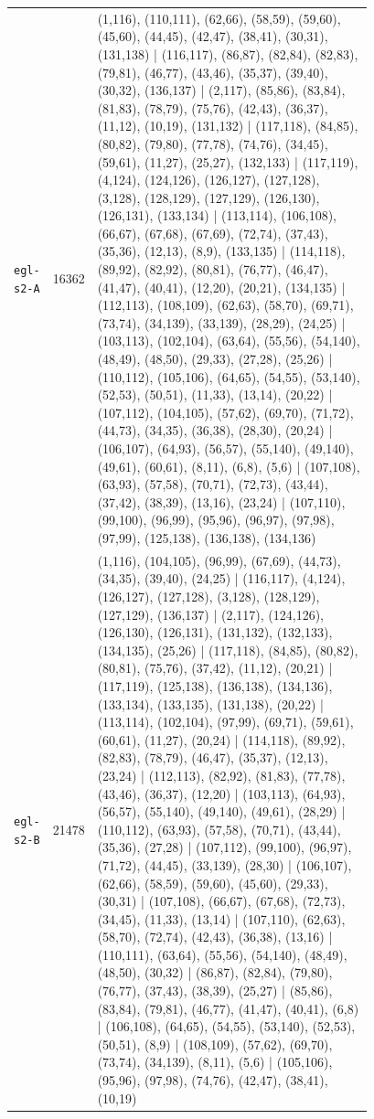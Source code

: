 \begin{landscape}
\begin{longtable}{lr>{\tiny\raggedright\arraybackslash}p{0.78\linewidth}}
\texttt{egl-s2-A} & 16362 & (1,116), (110,111), (62,66), (58,59), (59,60), (45,60), (44,45), (42,47), (38,41), (30,31), (131,138) | (116,117), (86,87), (82,84), (82,83), (79,81), (46,77), (43,46), (35,37), (39,40), (30,32), (136,137) | (2,117), (85,86), (83,84), (81,83), (78,79), (75,76), (42,43), (36,37), (11,12), (10,19), (131,132) | (117,118), (84,85), (80,82), (79,80), (77,78), (74,76), (34,45), (59,61), (11,27), (25,27), (132,133) | (117,119), (4,124), (124,126), (126,127), (127,128), (3,128), (128,129), (127,129), (126,130), (126,131), (133,134) | (113,114), (106,108), (66,67), (67,68), (67,69), (72,74), (37,43), (35,36), (12,13), (8,9), (133,135) | (114,118), (89,92), (82,92), (80,81), (76,77), (46,47), (41,47), (40,41), (12,20), (20,21), (134,135) | (112,113), (108,109), (62,63), (58,70), (69,71), (73,74), (34,139), (33,139), (28,29), (24,25) | (103,113), (102,104), (63,64), (55,56), (54,140), (48,49), (48,50), (29,33), (27,28), (25,26) | (110,112), (105,106), (64,65), (54,55), (53,140), (52,53), (50,51), (11,33), (13,14), (20,22) | (107,112), (104,105), (57,62), (69,70), (71,72), (44,73), (34,35), (36,38), (28,30), (20,24) | (106,107), (64,93), (56,57), (55,140), (49,140), (49,61), (60,61), (8,11), (6,8), (5,6) | (107,108), (63,93), (57,58), (70,71), (72,73), (43,44), (37,42), (38,39), (13,16), (23,24) | (107,110), (99,100), (96,99), (95,96), (96,97), (97,98), (97,99), (125,138), (136,138), (134,136) \\[2pt]
\texttt{egl-s2-B} & 21478 & (1,116), (104,105), (96,99), (67,69), (44,73), (34,35), (39,40), (24,25) | (116,117), (4,124), (126,127), (127,128), (3,128), (128,129), (127,129), (136,137) | (2,117), (124,126), (126,130), (126,131), (131,132), (132,133), (134,135), (25,26) | (117,118), (84,85), (80,82), (80,81), (75,76), (37,42), (11,12), (20,21) | (117,119), (125,138), (136,138), (134,136), (133,134), (133,135), (131,138), (20,22) | (113,114), (102,104), (97,99), (69,71), (59,61), (60,61), (11,27), (20,24) | (114,118), (89,92), (82,83), (78,79), (46,47), (35,37), (12,13), (23,24) | (112,113), (82,92), (81,83), (77,78), (43,46), (36,37), (12,20) | (103,113), (64,93), (56,57), (55,140), (49,140), (49,61), (28,29) | (110,112), (63,93), (57,58), (70,71), (43,44), (35,36), (27,28) | (107,112), (99,100), (96,97), (71,72), (44,45), (33,139), (28,30) | (106,107), (62,66), (58,59), (59,60), (45,60), (29,33), (30,31) | (107,108), (66,67), (67,68), (72,73), (34,45), (11,33), (13,14) | (107,110), (62,63), (58,70), (72,74), (42,43), (36,38), (13,16) | (110,111), (63,64), (55,56), (54,140), (48,49), (48,50), (30,32) | (86,87), (82,84), (79,80), (76,77), (37,43), (38,39), (25,27) | (85,86), (83,84), (79,81), (46,77), (41,47), (40,41), (6,8) | (106,108), (64,65), (54,55), (53,140), (52,53), (50,51), (8,9) | (108,109), (57,62), (69,70), (73,74), (34,139), (8,11), (5,6) | (105,106), (95,96), (97,98), (74,76), (42,47), (38,41), (10,19) \\[2pt]

\end{longtable}
\end{landscape}
